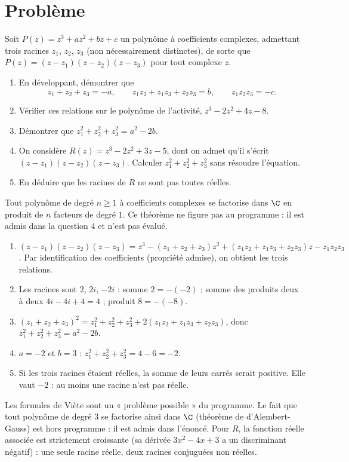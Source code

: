 \mxnewpage
\section{Problème}
\begin{problem}
Soit $P(z)=z^3+az^2+bz+c$ un polynôme à coefficients complexes, admettant trois racines $z_1$, $z_2$, $z_3$ (non nécessairement distinctes), de sorte que $P(z)=(z-z_1)(z-z_2)(z-z_3)$ pour tout complexe $z$.
\begin{enumerate}
\item En développant, démontrer que
\[z_1+z_2+z_3=-a,\qquad z_1z_2+z_1z_3+z_2z_3=b,\qquad z_1z_2z_3=-c.\]
\item Vérifier ces relations sur le polynôme de l'activité, $z^3-2z^2+4z-8$.
\item Démontrer que $z_1^2+z_2^2+z_3^2=a^2-2b$.
\item On considère $R(z)=z^3-2z^2+3z-5$, dont on admet qu'il s'écrit $(z-z_1)(z-z_2)(z-z_3)$. Calculer $z_1^2+z_2^2+z_3^2$ sans résoudre l'équation.
\item En déduire que les racines de $R$ ne sont pas toutes réelles.
\end{enumerate}
\end{problem}
\begin{beyond}Tout polynôme de degré $n\ge1$ à coefficients complexes se factorise dans $\C$ en produit de $n$ facteurs de degré $1$. Ce théorème ne figure pas au programme : il est admis dans la question 4 et n'est pas évalué.\end{beyond}
\begin{solution}[Problème]
\begin{enumerate}
\item $(z-z_1)(z-z_2)(z-z_3)=z^3-(z_1+z_2+z_3)z^2+(z_1z_2+z_1z_3+z_2z_3)z-z_1z_2z_3$. Par identification des coefficients (propriété admise), on obtient les trois relations.
\item Les racines sont $2$, $2i$, $-2i$ : somme $2=-(-2)$ ; somme des produits deux à deux $4i-4i+4=4$ ; produit $8=-(-8)$.
\item $(z_1+z_2+z_3)^2=z_1^2+z_2^2+z_3^2+2(z_1z_2+z_1z_3+z_2z_3)$, donc $z_1^2+z_2^2+z_3^2=a^2-2b$.
\item $a=-2$ et $b=3$ : $z_1^2+z_2^2+z_3^2=4-6=-2$.
\item Si les trois racines étaient réelles, la somme de leurs carrés serait positive. Elle vaut $-2$ : au moins une racine n'est pas réelle.
\end{enumerate}
\end{solution}
\begin{teachernote}
Les formules de Viète sont un « problème possible » du programme. Le fait que tout polynôme de degré $3$ se factorise ainsi dans $\C$ (théorème de d'Alembert-Gauss) est hors programme : il est admis dans l'énoncé. Pour $R$, la fonction réelle associée est strictement croissante (sa dérivée $3x^2-4x+3$ a un discriminant négatif) : une seule racine réelle, deux racines conjuguées non réelles.
\end{teachernote}
